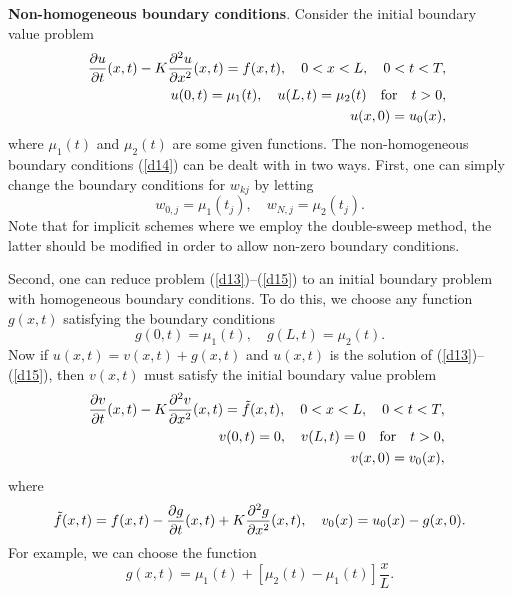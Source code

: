   
 
\textbf{Non-homogeneous boundary conditions}. Consider
the initial boundary value problem
\begin{eqnarray}
&&\frac{{\partial} u}{{\partial} t}(x,t) - K\frac{{\partial}^{2} u}{{\partial} x^{2}}(x,t)=f(x,t), \quad
0<x< L, \quad 0<t<T,   \label{d13} \\
&&u(0,t)=\mu_{1}(t), \quad u(L,t)=\mu_{2}(t) \quad \hbox{for} \quad t>0, \label{d14} \\
&&u(x, 0) = u_{0}(x),   \label{d15}
\end{eqnarray}
where $\mu_{1}(t)$ and $\mu_{2}(t)$ are some given functions.
The non-homogeneous boundary conditions (\ref{d14}) can be
dealt with in two ways. First, one can simply change
the boundary conditions for $w_{kj}$ by letting
\begin{equation}
w_{0,j}=\mu_{1}(t_j), \quad w_{N,j}=\mu_{2}(t_j). \label{d16}
\end{equation}
Note that for implicit schemes where we employ the double-sweep method, the latter should be modified
in order to allow non-zero boundary conditions.

\vskip 3mm
 
Second, one can reduce problem (\ref{d13})--(\ref{d15}) to an initial boundary
problem with homogeneous boundary conditions. To do this, we choose any function
$g(x,t)$ satisfying the boundary conditions
\begin{equation}
g(0,t)=\mu_{1}(t), \quad g(L,t)=\mu_{2}(t). \label{d17}
\end{equation}
Now if $u(x,t)=v(x,t)+g(x,t)$ and $u(x,t)$ is the solution of
(\ref{d13})--(\ref{d15}), then $v(x,t)$ must satisfy the initial boundary value
problem
\begin{eqnarray}
&&\frac{{\partial} v}{{\partial} t}(x,t) - K\frac{{\partial}^{2} v}{{\partial} x^{2}}(x,t)=\tilde{f}(x,t), \quad
0<x< L, \quad 0<t<T,   \label{d18} \\
&&v(0,t)=0, \quad v(L,t)=0 \quad \hbox{for} \quad t>0, \label{d19} \\
&&v(x, 0) = v_{0}(x),   \label{d20}
\end{eqnarray}
where
\[
\tilde{f}(x,t)=f(x,t)-
\frac{{\partial} g}{{\partial} t}(x,t) + K\frac{{\partial}^{2} g}{{\partial} x^{2}}(x,t), \quad
v_{0}(x)=u_{0}(x)-g(x,0).
\]
For example, we can choose the function
\[
g(x,t)=\mu_{1}(t)+[\mu_{2}(t)-\mu_{1}(t)]\frac{x}{L}.
\]




